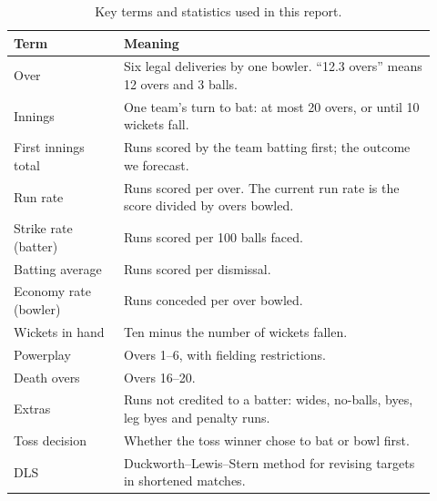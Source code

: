 \documentclass{article}
\newcommand{\1}{\mathbf{1}}
\begin{document}
\begin{table}[H]
\centering
\caption{Key terms and statistics used in this report.}
\label{tab:glossary}
\small
\begin{tabular}{>{\raggedright\arraybackslash}p{0.24\linewidth}>{\raggedright\arraybackslash}p{0.68\linewidth}}
\toprule
Term & Meaning \\
\midrule
Over & Six legal deliveries by one bowler. ``12.3 overs'' means 12 overs and 3 balls. \\
Innings & One team's turn to bat: at most 20 overs, or until 10 wickets fall. \\
First innings total & Runs scored by the team batting first; the outcome we forecast. \\
Run rate & Runs scored per over. The current run rate is the score divided by overs bowled. \\
Strike rate (batter) & Runs scored per 100 balls faced. \\
Batting average & Runs scored per dismissal. \\
Economy rate (bowler) & Runs conceded per over bowled. \\
Wickets in hand & Ten minus the number of wickets fallen. \\
Powerplay & Overs 1--6, with fielding restrictions. \\
Death overs & Overs 16--20. \\
Extras & Runs not credited to a batter: wides, no-balls, byes, leg byes and penalty runs. \\
Toss decision & Whether the toss winner chose to bat or bowl first. \\
DLS & Duckworth--Lewis--Stern method for revising targets in shortened matches. \\
\bottomrule
\end{tabular}
\end{table}
\end{document}

